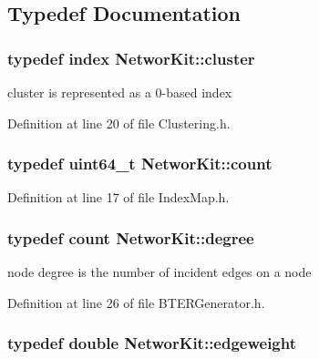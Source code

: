 \subsection{Typedef Documentation}
\hypertarget{namespace_networ_kit_a189884f50c41226806b31842d2214b71}{
\subsubsection[{cluster}]{\setlength{\rightskip}{0pt plus 5cm}typedef {\bf index} {\bf Networ\-Kit\-::cluster}}}\label{namespace_networ_kit_a189884f50c41226806b31842d2214b71}


cluster is represented as a 0-\/based index 



Definition at line 20 of file Clustering.\-h.

\hypertarget{namespace_networ_kit_a76b399edfa50ae72e4aa86007aaa800a}{
\subsubsection[{count}]{\setlength{\rightskip}{0pt plus 5cm}typedef uint64\-\_\-t {\bf Networ\-Kit\-::count}}}\label{namespace_networ_kit_a76b399edfa50ae72e4aa86007aaa800a}


Definition at line 17 of file Index\-Map.\-h.

\hypertarget{namespace_networ_kit_a48d18919ac945df34215375cfaa915bc}{
\subsubsection[{degree}]{\setlength{\rightskip}{0pt plus 5cm}typedef {\bf count} {\bf Networ\-Kit\-::degree}}}\label{namespace_networ_kit_a48d18919ac945df34215375cfaa915bc}


node degree is the number of incident edges on a node 



Definition at line 26 of file B\-T\-E\-R\-Generator.\-h.

\hypertarget{namespace_networ_kit_a831b108dbcd79dad062d9e28b1b4e3dd}{
\subsubsection[{edgeweight}]{\setlength{\rightskip}{0pt plus 5cm}typedef double {\bf Networ\-Kit\-::edgeweight}}}\label{namespace_networ_kit_a831b108dbcd79dad062d9e28b1b4e3dd}


